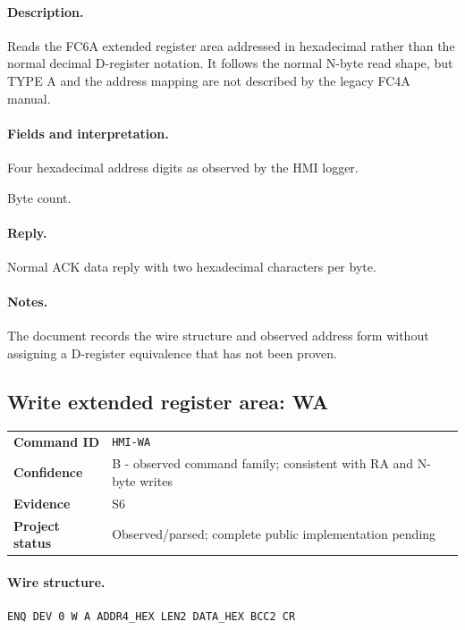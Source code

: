 \documentclass[10pt,letterpaper]{article}
\begin{document}
\paragraph{Description.} Reads the FC6A extended register area addressed in hexadecimal rather than the normal decimal D-register notation. It follows the normal N-byte read shape, but TYPE A and the address mapping are not described by the legacy FC4A manual.
\paragraph{Fields and interpretation.}
\begin{description}[style=nextline,leftmargin=3.2cm,labelwidth=3.0cm,font=\normalfont\bfseries]
\item[ADDR4\_HEX] Four hexadecimal address digits as observed by the HMI logger.
\item[LEN2] Byte count.
\end{description}
\paragraph{Reply.} Normal ACK data reply with two hexadecimal characters per byte.
\paragraph{Notes.} The document records the wire structure and observed address form without assigning a D-register equivalence that has not been proven.

\subsection{Write extended register area: WA}
\begin{tabularx}{\textwidth}{@{}>{\bfseries}p{2.8cm}X@{}}
Command ID & \texttt{HMI-WA} \\
Confidence & B - observed command family; consistent with RA and N-byte writes \\
Evidence & S6 \\
Project status & Observed/parsed; complete public implementation pending \\
\end{tabularx}
\vspace{0.35em}
\paragraph{Wire structure.}
\begin{Verbatim}[breaklines=true,breakanywhere=true,fontsize=\small]
ENQ DEV 0 W A ADDR4_HEX LEN2 DATA_HEX BCC2 CR
\end{Verbatim}
\end{document}
